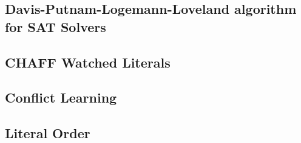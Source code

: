 


\subsection{Davis-Putnam-Logemann-Loveland algorithm for SAT Solvers}


\subsection{CHAFF Watched Literals}

\subsection{Conflict Learning}



\subsection{Literal Order}



